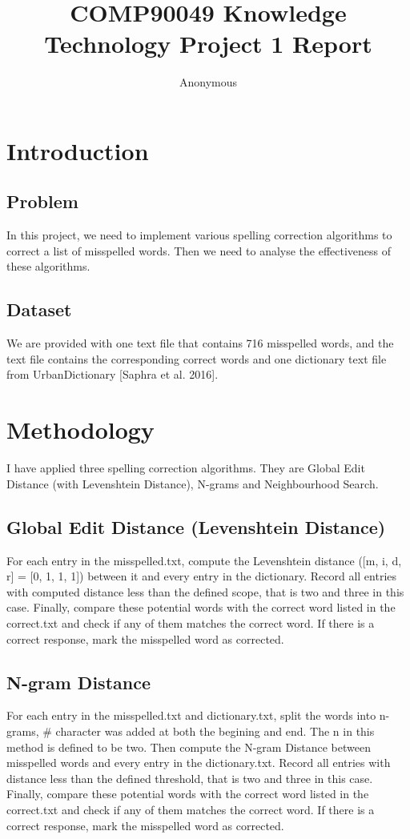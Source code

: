 \documentclass[11pt]{article}
\title{COMP90049 Knowledge Technology Project 1 Report}
\author{Anonymous}
\begin{document}
\maketitle

\section{Introduction}
  \subsection{Problem}
  In this project, we need to implement various spelling correction algorithms
  to correct a list of misspelled words. Then we need to analyse the
  effectiveness of these algorithms.
  \subsection{Dataset}
  We are provided with one text file that contains 716
  misspelled words, and the text file contains the corresponding correct words
  and one dictionary text file from UrbanDictionary [Saphra et al. 2016].

\section{Methodology}
I have applied three spelling correction algorithms.
They are Global Edit Distance (with Levenshtein Distance),
N-grams and Neighbourhood Search.

  \subsection{Global Edit Distance (Levenshtein Distance)}
  For each entry in the misspelled.txt, compute the Levenshtein distance
  ([m, i, d, r] = [0, 1, 1, 1]) between
  it and every entry in the dictionary. Record all entries with computed distance
  less than the defined scope, that is two and three in this case.
  Finally, compare these potential
  words with the correct word listed in the correct.txt and check if any of them
  matches the correct word. If there is a correct response, mark the misspelled word as
  corrected.

  \subsection{N-gram Distance}
  For each entry in the misspelled.txt and dictionary.txt, split the words into n-grams,
  $\#$ character
  was added at both the begining and end. The n in this method is defined to be two.
  Then compute the N-gram Distance between misspelled words and every entry in the
  dictionary.txt. Record all entries with distance less than the defined threshold,
  that is two and three in this case.
  Finally, compare these potential words with the correct word listed in
  the correct.txt and check if any of them matches the correct word.
  If there is a correct response, mark the misspelled word as corrected.
\end{document}
